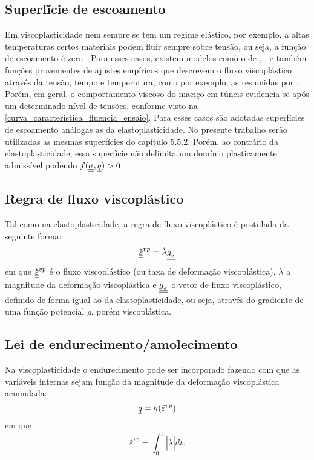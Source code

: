 \subsection{Superfície de escoamento}

Em viscoplasticidade nem sempre se tem um regime elástico, por exemplo, a altas temperaturas certos materiais podem fluir sempre sobre tensão, ou seja, a função de escoamento é zero \cite[p. 448]{Neto2008}. Para esses casos, existem modelos como o de , , e também funções provenientes de ajustes empíricos que descrevem o fluxo viscoplástico através da tensão, tempo e temperatura, como por exemplo, as resumidas por . Porém, em geral, o comportamento viscoso do maciço em túneis evidencia-se após um determinado nível de tensões, conforme visto na \autoref{curva_caracteristica_fluencia_ensaio}. Para esses casos são adotadas superfícies de escoamento análogas as da elastoplasticidade. No presente trabalho serão utilizadas as mesmas superfícies do capítulo 5.5.2. Porém, ao contrário da elastoplasticidade, essa superfície não delimita um domínio plasticamente admissível podendo $f(\underline{\underline \sigma},\underline q) > 0$.

\subsection{Regra de fluxo viscoplástico}
Tal como na elastoplasticidade, a regra de fluxo viscoplástico é postulada da seguinte forma:
\begin{equation}
	\label{eq:fluxo_viscoplastico}
	\dot {\underline{\underline \varepsilon}}^{vp} = \dot \lambda \underline{\underline {g_{_\sigma}}}
\end{equation}
em que $\dot {\underline{\underline \varepsilon}}^{vp}$ é o fluxo viscoplástico (ou taxa de deformação viscoplástica), $\lambda$ a magnitude da deformação viscoplástica e $\underline{\underline {g_{_\sigma}}}$ o vetor de fluxo viscoplástico, definido de forma igual ao da elastoplasticidade, ou seja, através do gradiente de uma função potencial $g$, porém viscoplástica.

\subsection{Lei de endurecimento/amolecimento}
Na viscoplasticidade o endurecimento pode ser incorporado fazendo com que as variáveis internas sejam função da magnitude da deformação viscoplástica acumulada:
\begin{equation}
	\label{eq:endurecimento_viscoplastico}
	\underline q=\underline h(\bar{\varepsilon}^{vp})
\end{equation}
em que
\begin{equation}
	\label{eq:epslonvpbar}
	\bar{\varepsilon}^{vp} = \int_{0}^{t}|\dot \lambda|dt.
\end{equation}

